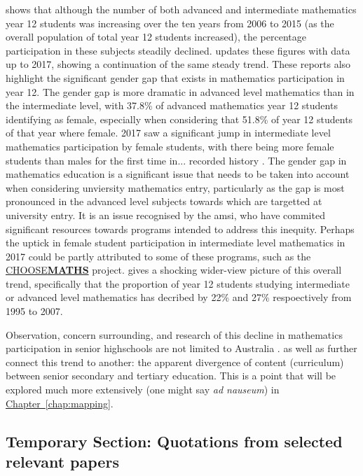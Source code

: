 \documentclass[twoside,12pt,a4paper]{report}
\newcommand{\refchap}[1]{\hyperref[chap:#1]{Chapter~\ref{chap:#1}}}
\begin{document}
\cite{Barrington2016} shows that although the number of both advanced and intermediate mathematics year 12 students was increasing over the ten years from 2006 to 2015 (as the overall population of total year 12 students increased), the percentage participation in these subjects steadily declined. \cite{James2019} updates these figures with data up to 2017, showing a continuation of the same steady trend. These reports also highlight the significant gender gap that exists in mathematics participation in year 12. The gender gap is more dramatic in advanced level mathematics than in the intermediate level, with 37.8\% of advanced mathematics year 12 students identifying as female, especially when considering that 51.8\% of year 12 students of that year where female. 2017 saw a significant jump in intermediate level mathematics participation by female students, with there being more female students than males for the first time in... recorded history \cite{James2019}. The gender gap in mathematics education is a significant issue that needs to be taken into account when considering unviersity mathematics entry, particularly as the gap is most pronounced in the advanced level subjects towards which are targetted at university entry. It is an issue recognised by the \gls{amsi}, who have commited significant resources towards programs intended to address this inequity. Perhaps the uptick in female student participation in intermediate level mathematics in 2017 could be partly attributed to some of these programs, such as the \href{https://choosemaths.org.au/}{CHOOSE\textbf{MATHS}} project. \cite{Brown2009} gives a shocking wider-view picture of this overall trend, specifically that the proportion of year 12 students studying intermediate or advanced level mathematics has decribed by 22\% and 27\% respoectively from 1995 to 2007. 

Observation, concern surrounding, and research of this decline in mathematics participation in senior highschools are not limited to Australia \cite{Hourigan2007, Hoyles2001}. \cite{Hoyles2001} as well as \cite{Luk2005} further connect this trend to another: the apparent divergence of content (curriculum) between senior secondary and tertiary education. This is a point that will be explored much more extensively (one might say \emph{ad nauseum}) in \refchap{mapping}.

\subsection{Temporary Section: Quotations from selected relevant papers}
\end{document}
